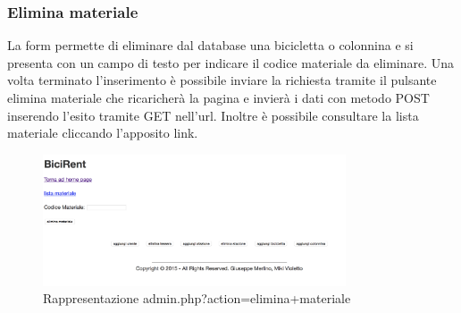 \documentclass[a4paper,twoside]{article}
\begin{document}
\subsubsection{Elimina materiale}
La form permette di eliminare dal database una bicicletta o colonnina e si presenta con un campo di testo per indicare il codice materiale da eliminare. Una volta terminato l'inserimento è possibile inviare la richiesta tramite il pulsante elimina materiale che ricaricherà la pagina e invierà i dati con metodo POST inserendo l'esito tramite GET nell'url. Inoltre è possibile consultare la lista materiale cliccando l'apposito link.
\begin{figure}[H]
	\centering
	\includegraphics[width=0.8\textwidth]{Screenshot13}
	\caption{Rappresentazione admin.php?action=elimina+materiale}
\end{figure}
\end{document}
